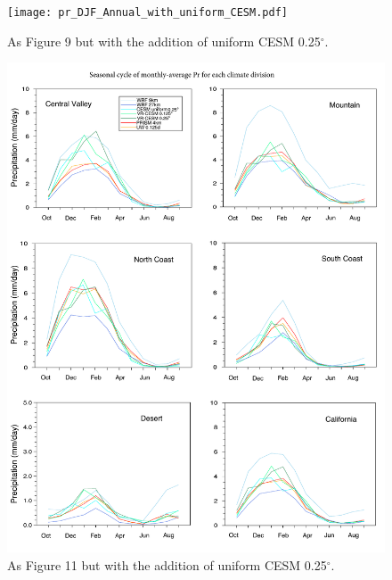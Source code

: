 \documentclass[ms]{agutexSI}
\begin{document}
\begin{figure}
\begin{center}
\texttt{[image: pr\_DJF\_Annual\_with\_uniform\_CESM.pdf]}
\caption{As Figure 9 but with the addition of uniform CESM 0.25$^\circ$.}
\end{center}
\end{figure}

\begin{figure}
\begin{center}
\includegraphics[width=6in]{trd_pr_allzones_with_uniform_CESM.pdf}
\caption{As Figure 11 but with the addition of uniform CESM 0.25$^\circ$.}
\end{center}
\end{figure}

\clearpage
\end{document}
